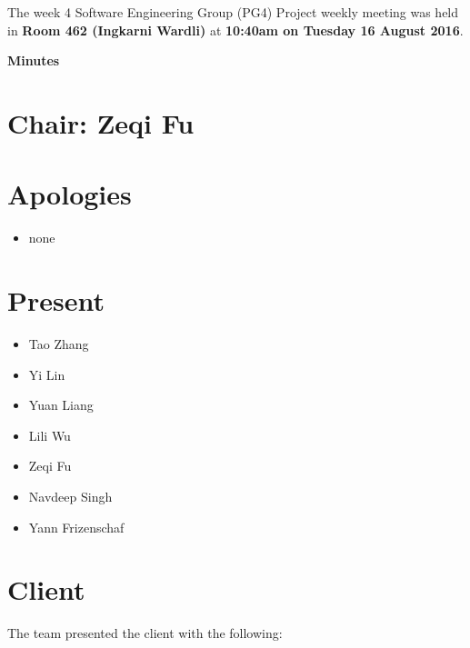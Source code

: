 \documentclass[11pt, a4paper]{article}
\begin{document}
\noindent The week 4 Software Engineering Group (PG4) Project weekly meeting was held in {\bf Room 462 (Ingkarni Wardli)} at {\bf 10:40am on Tuesday 16 August 2016}.

\vspace*{15pt}
\begin{center}
\huge \bf Minutes
\end{center}

\section*{Chair: Zeqi Fu}
\vspace*{10pt}

\section{Apologies}
\begin{itemize}
\item none
\end{itemize}

\section{Present}
\begin{itemize}
\item Tao Zhang
\item Yi Lin
\item Yuan Liang
\item Lili Wu
\item Zeqi Fu
\item Navdeep Singh
\item Yann Frizenschaf
\end{itemize}

\section{Client}
The team presented the client with the following:
\end{document}
